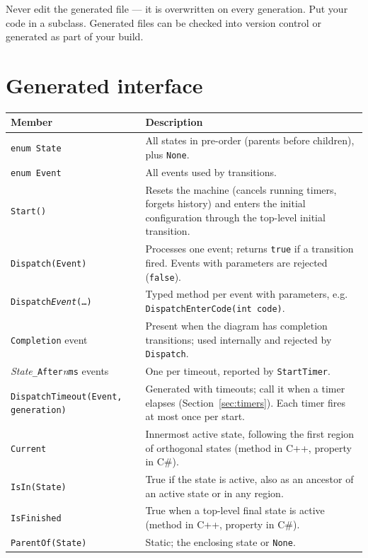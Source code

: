 \documentclass[11pt,a4paper,openany]{report}
\newcommand{\code}[1]{\texttt{#1}}
\begin{document}
\begin{caution}
Never edit the generated file --- it is overwritten on every generation. Put your code in a subclass.
Generated files can be checked into version control or generated as part of your build.
\end{caution}

\section{Generated interface}
\begin{longtable}{@{}p{4.4cm}p{10cm}@{}}
\toprule
\textbf{Member} & \textbf{Description} \\
\midrule
\endhead
\code{enum State}             & All states in pre-order (parents before children), plus \code{None}. \\
\code{enum Event}             & All events used by transitions. \\
\code{Start()}                & Resets the machine (cancels running timers, forgets history) and enters the initial configuration through the top-level initial transition. \\
\code{Dispatch(Event)}        & Processes one event; returns \code{true} if a transition fired. Events with parameters are rejected (\code{false}). \\
\code{Dispatch\textit{Event}(\dots)} & Typed method per event with parameters, e.g. \code{DispatchEnterCode(int code)}. \\
\code{Completion} event       & Present when the diagram has completion transitions; used internally and rejected by \code{Dispatch}. \\
\textit{State}\code{\_After}\textit{n}\code{ms} events & One per timeout, reported by \code{StartTimer}. \\
\code{DispatchTimeout(Event, generation)} & Generated with timeouts; call it when a timer elapses (Section~\ref{sec:timers}). Each timer fires at most once per start. \\
\code{Current}                & Innermost active state, following the first region of orthogonal states (method in C++, property in C\#). \\
\code{IsIn(State)}            & True if the state is active, also as an ancestor of an active state or in any region. \\
\code{IsFinished}             & True when a top-level final state is active (method in C++, property in C\#). \\
\code{ParentOf(State)}        & Static; the enclosing state or \code{None}. \\

\end{longtable}
\end{document}
